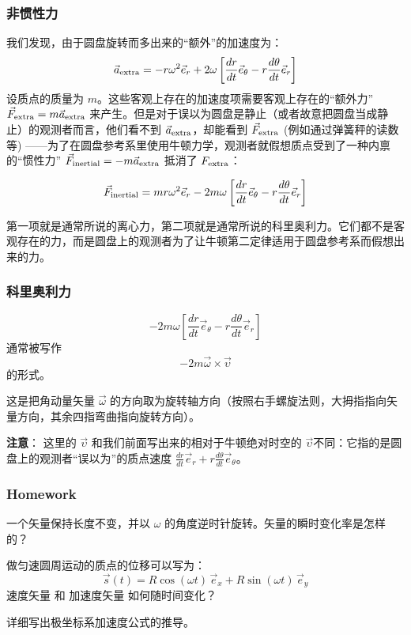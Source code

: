 \documentclass[CJK,13pt]{beamer}
\begin{document}
\begin{frame}
  \frametitle{非惯性力}
  我们发现，由于圆盘旋转而多出来的“额外”的加速度为：
  $$ \vec{a}_{\rm extra} = - r\omega^2\vec{e}_r + 2\omega \left[\frac{dr}{dt}\vec{e}_\theta  - r\frac{d\theta}{dt}\vec{e}_r\right] $$
  设质点的质量为 $m$。这些客观上存在的加速度项需要客观上存在的“额外力” $\vec{F}_{\rm extra} =  m\vec{a}_{\rm extra} $ 来产生。但是对于误以为圆盘是静止（或者故意把圆盘当成静止）的观测者而言，他们看不到 $\vec{a}_{\rm extra}$，却能看到 $\vec{F}_{\rm extra}$ (例如通过弹簧秤的读数等) ——为了在圆盘参考系里使用牛顿力学，观测者就假想质点受到了一种内禀的“惯性力” $\vec{F}_{\rm inertial} = -m\vec{a}_{\rm extra}$ 抵消了 $F_{\rm extra}$：

  $$ \vec{F}_{\rm inertial} = m r\omega^2 \vec{e}_r - 2m \omega \left[\frac{dr}{dt}\vec{e}_\theta  - r\frac{d\theta}{dt}\vec{e}_r\right]  $$

  第一项就是通常所说的离心力，第二项就是通常所说的科里奥利力。它们都不是客观存在的力，而是圆盘上的观测者为了让牛顿第二定律适用于圆盘参考系而假想出来的力。
\end{frame}


\begin{frame}
  \frametitle{科里奥利力}
  
  $$- 2m \omega \left[\frac{dr}{dt}\vec{e}_\theta  - r\frac{d\theta}{dt}\vec{e}_r\right] $$
  通常被写作 $$-2m\vec{\omega}\times \vec{\upsilon}$$ 的形式。

  这是把角动量矢量 $\vec{\omega}$ 的方向取为旋转轴方向（按照右手螺旋法则，大拇指指向矢量方向，其余四指弯曲指向旋转方向）。

  \skipline

 {\bf 注意}： 这里的 $\vec{\upsilon}$ 和我们前面写出来的相对于牛顿绝对时空的 $\vec{\upsilon}$不同：它指的是圆盘上的观测者“误以为”的质点速度 $\frac{dr}{dt}\vec{e}_r + r\frac{d\theta}{dt}\vec{e}_\theta$。

\end{frame}


\begin{frame}
  \frametitle{Homework}
  \bitem  
\item{一个矢量保持长度不变，并以 $\omega$ 的角度逆时针旋转。矢量的瞬时变化率是怎样的？}
\item{做匀速圆周运动的质点的位移可以写为：
  $$ \vec{s}(t) = R\cos(\omega t) \, \vec{e}_x + R\sin(\omega t)\, \vec{e}_y $$
  速度矢量 和 加速度矢量 如何随时间变化？
}    
\item{详细写出极坐标系加速度公式的推导。}
  \eitem
\end{frame}


\ech
\end{document}
